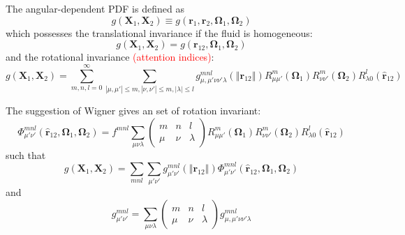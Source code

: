 The angular-dependent \acs{PDF} is defined as 
\begin{equation}
g(\mathbf{X}_{1},\mathbf{X}_{2})\equiv g(\mathbf{r}_{1},\mathbf{r}_{2},\mathbf{\Omega}_{1},\mathbf{\Omega}_{2})
\end{equation}
which possesses the translational invariance if the fluid is homogeneous:
\begin{equation}
g(\mathbf{X}_{1},\mathbf{X}_{2})=g(\mathbf{r}_{12},\mathbf{\Omega}_{1},\mathbf{\Omega}_{2})
\end{equation}
and the rotational invariance \textcolor{red}{(attention indices)}:
\begin{equation}
g(\mathbf{X}_{1},\mathbf{X}_{2})=\sum_{m,n,l=0}^{\infty}\sum_{\left|\mu,\mu'\right|\leq m,\left|\nu,\nu'\right|\leq m,\left|\lambda\right|\leq l}g_{\mu,\mu'\nu\nu'\lambda}^{mnl}(\left\Vert \mathbf{r}_{12}\right\Vert )R_{\mu\mu'}^{m}(\mathbf{\Omega}_{1})R_{\nu\nu'}^{m}(\mathbf{\Omega}_{2})R_{\lambda0}^{l}(\hat{\mathbf{r}}_{12})
\end{equation}

The suggestion of Wigner gives an set of rotation invariant:
\begin{equation}
\Phi_{\mu'\nu'}^{mnl}(\hat{\mathbf{r}}_{12},\mathbf{\Omega}_{1},\mathbf{\Omega}_{2})=f^{mnl}\sum_{\mu\nu\lambda}\left(\begin{array}{ccc}
m & n & l\\
\mu & \nu & \lambda
\end{array}\right)R_{\mu\mu'}^{m}(\mathbf{\Omega}_{1})R_{\nu\nu'}^{m}(\mathbf{\Omega}_{2})R_{\lambda0}^{l}(\hat{\mathbf{r}}_{12})
\end{equation}
such that
\begin{equation}
g(\mathbf{X}_{1},\mathbf{X}_{2})=\sum_{mnl}\sum_{\mu'\nu'}g_{\mu'\nu'}^{mnl}(\left\Vert \mathbf{r}_{12}\right\Vert )\Phi_{\mu'\nu'}^{mnl}(\hat{\mathbf{r}}_{12},\mathbf{\Omega}_{1},\mathbf{\Omega}_{2})
\end{equation}
and
\begin{equation}
g_{\mu'\nu'}^{mnl}=\sum_{\mu\nu\lambda}\left(\begin{array}{ccc}
m & n & l\\
\mu & \nu & \lambda
\end{array}\right)g_{\mu,\mu'\nu\nu'\lambda}^{mnl}
\end{equation}

